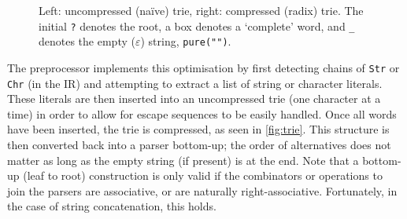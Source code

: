 \begin{figure}[H]
    \caption{
        Left: uncompressed (na\"{i}ve) trie, right: compressed (radix) trie.
        The initial \texttt{?} denotes the root, a box denotes a `complete' word, and \texttt{\_} denotes the empty ($\varepsilon$) string, \texttt{pure("")}.
    }
    \label{fig:trie}
\end{figure}

The preprocessor implements this optimisation by first detecting chains of \texttt{Str} or \texttt{Chr} (in the IR) and attempting to extract a list of string or character literals.
These literals are then inserted into an uncompressed trie (one character at a time) in order to allow for escape sequences to be easily handled.
Once all words have been inserted, the trie is compressed, as seen in \autoref{fig:trie}.
This structure is then converted back into a parser bottom-up; the order of alternatives does not matter as long as the empty string (if present) is at the end.
Note that a bottom-up (leaf to root) construction is only valid if the combinators or operations to join the parsers are associative, or are naturally right-associative.
Fortunately, in the case of string concatenation, this holds.